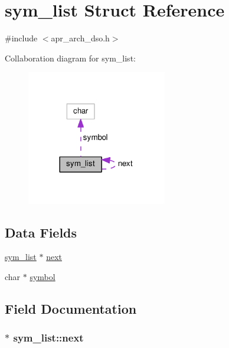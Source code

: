 \hypertarget{structsym__list}{}\section{sym\+\_\+list Struct Reference}
\label{structsym__list}


{\ttfamily \#include $<$apr\+\_\+arch\+\_\+dso.\+h$>$}



Collaboration diagram for sym\+\_\+list\+:
\nopagebreak
\begin{figure}[H]
\begin{center}
\leavevmode
\includegraphics[width=173pt]{structsym__list__coll__graph}
\end{center}
\end{figure}
\subsection*{Data Fields}
\begin{DoxyCompactItemize}
\item 
\hyperlink{structsym__list}{sym\+\_\+list} $\ast$ \hyperlink{structsym__list_a855ebba82b4ac68081f6e9bc599c4e1b}{next}
\item 
char $\ast$ \hyperlink{structsym__list_a1f3e4b6c851ab374a8d527c95abefdf0}{symbol}
\end{DoxyCompactItemize}


\subsection{Field Documentation}
\subsubsection[{\texorpdfstring{next}{next}}]{$\ast$ sym\+\_\+list\+::next}\hypertarget{structsym__list_a855ebba82b4ac68081f6e9bc599c4e1b}{}\label{structsym__list_a855ebba82b4ac68081f6e9bc599c4e1b}
